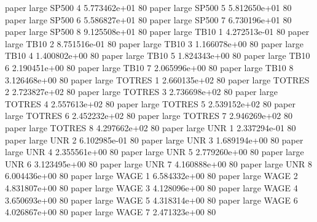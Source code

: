               paper      large    SP500                 4 5.773462e+01 80
              paper      large    SP500                 5 5.812650e+01 80
              paper      large    SP500                 6 5.586827e+01 80
              paper      large    SP500                 7 6.730196e+01 80
              paper      large    SP500                 8 9.125508e+01 80
              paper      large     TB10                 1 4.272513e-01 80
              paper      large     TB10                 2 8.751516e-01 80
              paper      large     TB10                 3 1.166078e+00 80
              paper      large     TB10                 4 1.400802e+00 80
              paper      large     TB10                 5 1.824343e+00 80
              paper      large     TB10                 6 2.190451e+00 80
              paper      large     TB10                 7 2.065996e+00 80
              paper      large     TB10                 8 3.126468e+00 80
              paper      large   TOTRES                 1 2.660135e+02 80
              paper      large   TOTRES                 2 2.723827e+02 80
              paper      large   TOTRES                 3 2.736698e+02 80
              paper      large   TOTRES                 4 2.557613e+02 80
              paper      large   TOTRES                 5 2.539152e+02 80
              paper      large   TOTRES                 6 2.452232e+02 80
              paper      large   TOTRES                 7 2.946269e+02 80
              paper      large   TOTRES                 8 4.297662e+02 80
              paper      large      UNR                 1 2.337294e-01 80
              paper      large      UNR                 2 6.102985e-01 80
              paper      large      UNR                 3 1.689194e+00 80
              paper      large      UNR                 4 2.355561e+00 80
              paper      large      UNR                 5 2.779260e+00 80
              paper      large      UNR                 6 3.123495e+00 80
              paper      large      UNR                 7 4.160888e+00 80
              paper      large      UNR                 8 6.004436e+00 80
              paper      large     WAGE                 1 6.584332e+00 80
              paper      large     WAGE                 2 4.831807e+00 80
              paper      large     WAGE                 3 4.128096e+00 80
              paper      large     WAGE                 4 3.650693e+00 80
              paper      large     WAGE                 5 4.318314e+00 80
              paper      large     WAGE                 6 4.026867e+00 80
              paper      large     WAGE                 7 2.471323e+00 80
